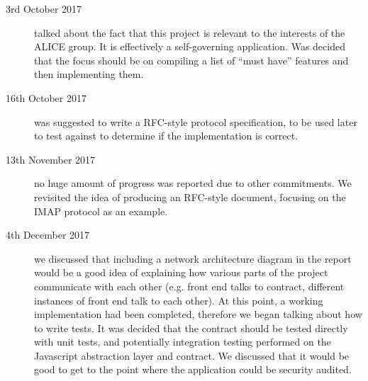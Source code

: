 \begin{description}
    \item[3rd October 2017] talked about the fact that this project is relevant to the interests of the ALICE group. It is effectively a self-governing application. Was decided that the focus should be on compiling a list of ``must have'' features and then implementing them.
    \item[16th October 2017] was suggested to write a RFC-style protocol specification, to be used later to test against to determine if the implementation is correct.
    \item[13th November 2017] no huge amount of progress was reported due to other commitments. We revisited the idea of producing an RFC-style document, focusing on the IMAP protocol as an example.
    \item[4th December 2017] we discussed that including a network architecture diagram in the report would be a good idea of explaining how various parts of the project communicate with each other (e.g. front end talks to contract, different instances of front end talk to each other). At this point, a working implementation had been completed, therefore we began talking about how to write tests. It was decided that the contract should be tested directly with unit tests, and potentially integration testing performed on the Javascript abstraction layer and contract. We discussed that it would be good to get to the point where the application could be security audited.
\end{description}


